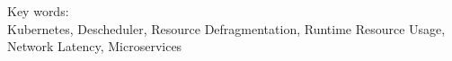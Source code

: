\vspace*{0.2cm}

\noindent Key words: \\ Kubernetes, Descheduler, Resource Defragmentation, Runtime Resource Usage, Network Latency, Microservices \\

\newpage
